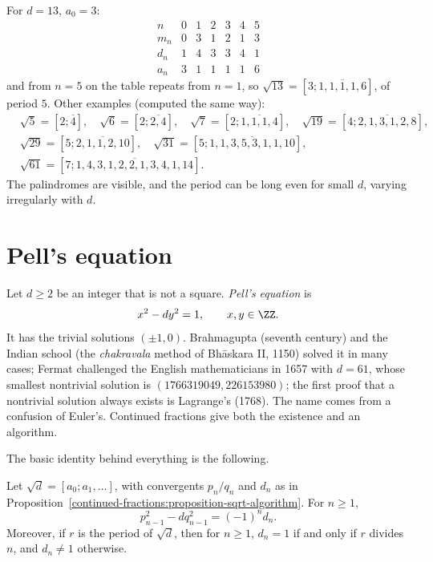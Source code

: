 \begin{example}\label{continued-fractions:example-sqrt-thirteen}
For $d = 13$, $a_0 = 3$:
\[
\begin{array}{c|cccccc}
n & 0 & 1 & 2 & 3 & 4 & 5\\ \hline
m_n & 0 & 3 & 1 & 2 & 1 & 3\\
d_n & 1 & 4 & 3 & 3 & 4 & 1\\
a_n & 3 & 1 & 1 & 1 & 1 & 6
\end{array}
\]
and from $n = 5$ on the table repeats from $n = 1$, so $\sqrt{13} = [3; \overline{1, 1, 1, 1, 6}]$, of period $5$. Other examples (computed the same way):
\[
\begin{aligned}
&\sqrt5 = [2; \overline{4}], \quad \sqrt6 = [2; \overline{2, 4}], \quad \sqrt7 = [2; \overline{1, 1, 1, 4}], \quad \sqrt{19} = [4; \overline{2, 1, 3, 1, 2, 8}],\\
&\sqrt{29} = [5; \overline{2, 1, 1, 2, 10}], \quad \sqrt{31} = [5; \overline{1, 1, 3, 5, 3, 1, 1, 10}],\\
&\sqrt{61} = [7; \overline{1, 4, 3, 1, 2, 2, 1, 3, 4, 1, 14}].
\end{aligned}
\]
The palindromes are visible, and the period can be long even for small $d$, varying irregularly with $d$.
\end{example}

\section{Pell's equation}\label{continued-fractions:section-pell}

Let $d \geq 2$ be an integer that is not a square. \emph{Pell's equation} is
\[
x^2 - dy^2 = 1, \qquad x, y \in \ZZ.
\]
It has the trivial solutions $(\pm 1, 0)$. Brahmagupta (seventh century) and the Indian school (the \emph{chakravala} method of Bhāskara II, 1150) solved it in many cases; Fermat challenged the English
mathematicians in 1657 with $d = 61$, whose smallest nontrivial solution is $(1766319049, 226153980)$; the first proof that a nontrivial solution always exists is Lagrange's (1768). The name comes
from a confusion of Euler's. Continued fractions give both the existence and an algorithm.

The basic identity behind everything is the following.

\begin{proposition}\label{continued-fractions:proposition-pell-identity}
Let $\sqrt d = [a_0; a_1, \ldots]$, with convergents $p_n/q_n$ and $d_n$ as in Proposition~\ref{continued-fractions:proposition-sqrt-algorithm}. For $n \geq 1$,
\begin{equation}\label{continued-fractions:equation-pell-identity}
p_{n-1}^2 - dq_{n-1}^2 = (-1)^nd_n.
\end{equation}
Moreover, if $r$ is the period of $\sqrt d$, then for $n \geq 1$, $d_n = 1$ if and only if $r$ divides $n$, and $d_n \neq 1$ otherwise.
\end{proposition}

